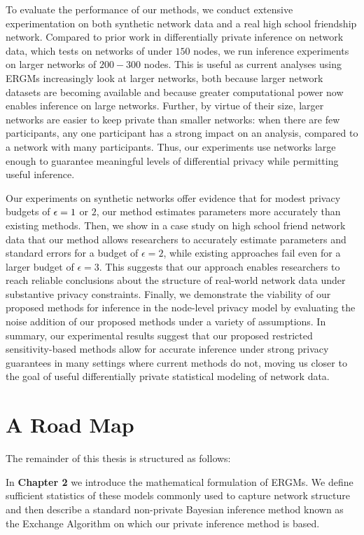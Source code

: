 To evaluate the performance of our methods, we conduct extensive experimentation on both synthetic network data and a real high school friendship network. Compared to prior work in differentially private inference on network data, which tests on networks of under $150$ nodes, we run inference experiments on larger networks of $200-300$ nodes. This is useful as current analyses using ERGMs increasingly look at larger networks, both because larger network datasets are becoming available and because greater computational power now enables inference on large networks. Further, by virtue of their size, larger networks are easier to keep private than smaller networks: when there are few participants, any one participant has a strong impact on an analysis, compared to a network with many participants. Thus, our experiments use networks large enough to guarantee meaningful levels of differential privacy while permitting useful inference.

 Our experiments on synthetic networks offer evidence that for modest privacy budgets of $\epsilon = 1$ or $2$, our method estimates parameters more accurately than existing methods. Then, we show in a case study on high school friend network data that our method allows researchers to accurately estimate parameters and standard errors for a budget of $\epsilon=2$, while existing approaches fail even for a larger budget of $\epsilon = 3$. This suggests that our approach enables researchers to reach reliable conclusions about the structure of real-world network data under substantive privacy constraints. Finally, we demonstrate the viability of our proposed methods for inference in the node-level privacy model by evaluating the noise addition of our proposed methods under a variety of assumptions. In summary, our experimental results suggest that our proposed restricted sensitivity-based methods allow for accurate inference under strong privacy guarantees in many settings where current methods do not, moving us closer to the goal of useful differentially private statistical modeling of network data.
 
\section{A Road Map}

The remainder of this thesis is structured as follows:

In \textbf{Chapter 2} we introduce the mathematical formulation of ERGMs. We define sufficient statistics of these models commonly used to capture network structure and then describe a standard non-private Bayesian inference method known as the Exchange Algorithm on which our private inference method is based.


